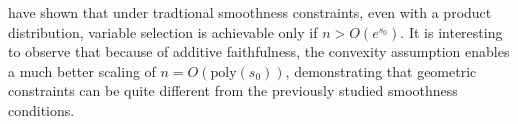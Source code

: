 \begin{remark}
  \citet{dalalyan:12} have shown that under tradtional smoothness
  constraints, even with a product distribution, variable selection is
  achievable only if $n > O(e^{s_0})$. It is interesting to observe that
  because of additive faithfulness, the convexity assumption enables a
  much better scaling of $n = O(\textrm{poly}(s_0))$, demonstrating that
  geometric constraints can be quite different from the previously
  studied smoothness conditions.
\end{remark}



 
